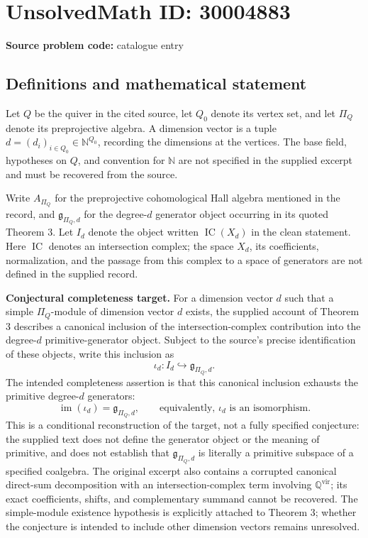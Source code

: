 \documentclass[11pt]{article}
\begin{document}
\section*{UnsolvedMath ID: 30004883}
\textbf{Source problem code:} catalogue entry
\subsection{Definitions and mathematical statement}
Let \(Q\) be the quiver in the cited source, let \(Q_0\) denote its vertex set, and let \(\Pi_Q\) denote its preprojective algebra. A dimension vector is a tuple \(d=(d_i)_{i\in Q_0}\in\mathbb N^{Q_0}\), recording the dimensions at the vertices. The base field, hypotheses on \(Q\), and convention for \(\mathbb N\) are not specified in the supplied excerpt and must be recovered from the source.

Write \(A_{\Pi_Q}\) for the preprojective cohomological Hall algebra mentioned in the record, and \(\mathfrak g_{\Pi_Q,d}\) for the degree-\(d\) generator object occurring in its quoted Theorem 3. Let \(I_d\) denote the object written \(\operatorname{IC}(X_d)\) in the clean statement. Here \(\operatorname{IC}\) denotes an intersection complex; the space \(X_d\), its coefficients, normalization, and the passage from this complex to a space of generators are not defined in the supplied record.

\textbf{Conjectural completeness target.} For a dimension vector \(d\) such that a simple \(\Pi_Q\)-module of dimension vector \(d\) exists, the supplied account of Theorem 3 describes a canonical inclusion of the intersection-complex contribution into the degree-\(d\) primitive-generator object. Subject to the source's precise identification of these objects, write this inclusion as
\[
\iota_d:I_d\hookrightarrow\mathfrak g_{\Pi_Q,d}.
\]
The intended completeness assertion is that this canonical inclusion exhausts the primitive degree-\(d\) generators:
\[
\operatorname{im}(\iota_d)=\mathfrak g_{\Pi_Q,d},
\qquad\text{equivalently, }\iota_d\text{ is an isomorphism}.
\]
This is a conditional reconstruction of the target, not a fully specified conjecture: the supplied text does not define the generator object or the meaning of primitive, and does not establish that \(\mathfrak g_{\Pi_Q,d}\) is literally a primitive subspace of a specified coalgebra. The original excerpt also contains a corrupted canonical direct-sum decomposition with an intersection-complex term involving \(\mathbb Q^{\mathrm{vir}}\); its exact coefficients, shifts, and complementary summand cannot be recovered. The simple-module existence hypothesis is explicitly attached to Theorem 3; whether the conjecture is intended to include other dimension vectors remains unresolved.
\end{document}
